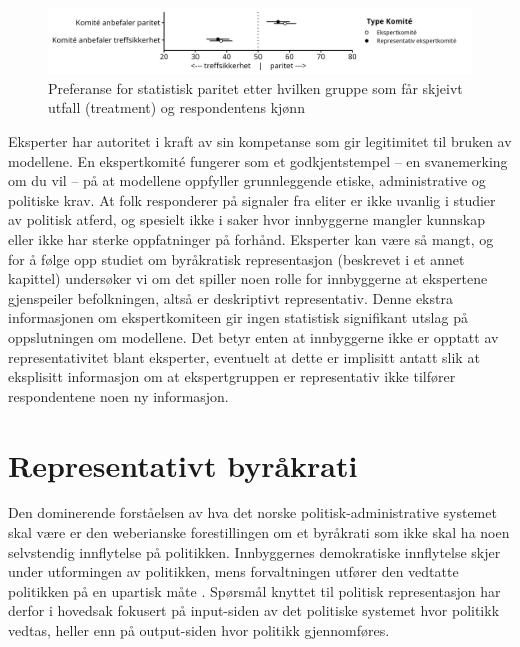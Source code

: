\documentclass[
  12pt,
  a4paper, 12pt]{article}
\begin{document}
\begin{figure}

{\centering \includegraphics[width=0.9\linewidth]{figs/png/fig_parity_komite} 

}

\caption{Preferanse for statistisk paritet etter hvilken gruppe som får skjeivt utfall (treatment) og respondentens kjønn}\label{fig:unnamed-chunk-32}
\end{figure}

Eksperter har autoritet i kraft av sin kompetanse som gir legitimitet til bruken av modellene.
En ekspertkomité fungerer som et godkjentstempel -- en svanemerking om du vil -- på at modellene oppfyller grunnleggende etiske, administrative og politiske krav.
At folk responderer på signaler fra eliter er ikke uvanlig i studier av politisk atferd, og spesielt ikke i saker hvor innbyggerne mangler kunnskap eller ikke har sterke oppfatninger på forhånd.
Eksperter kan være så mangt, og for å følge opp studiet om byråkratisk representasjon (beskrevet i et annet kapittel) undersøker vi om det spiller noen rolle for innbyggerne at ekspertene gjenspeiler befolkningen, altså er deskriptivt representativ.
Denne ekstra informasjonen om ekspertkomiteen gir ingen statistisk signifikant utslag på oppslutningen om modellene.
Det betyr enten at innbyggerne ikke er opptatt av representativitet blant eksperter, eventuelt at dette er implisitt antatt slik at eksplisitt informasjon om at ekspertgruppen er representativ ikke tilfører respondentene noen ny informasjon.

\newpage

\hypertarget{representasjon}{%
\section{Representativt byråkrati}\label{representasjon}}

Den dominerende forståelsen av hva det norske politisk-administrative systemet skal være er den weberianske forestillingen om et byråkrati som ikke skal ha noen selvstendig innflytelse på politikken.
Innbyggernes demokratiske innflytelse skjer under utformingen av politikken, mens forvaltningen utfører den vedtatte politikken på en upartisk måte \citep{rothstein2009creating, rosanvallon2011democratic}.
Spørsmål knyttet til politisk representasjon har derfor i hovedsak fokusert på input-siden av det politiske systemet hvor politikk vedtas, heller enn på output-siden hvor politikk gjennomføres.
\end{document}

